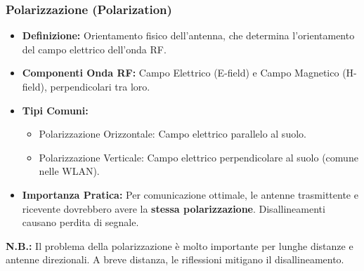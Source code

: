 \subsubsection{Polarizzazione (Polarization)}
\begin{itemize}
    \item \textbf{Definizione:} Orientamento fisico dell'antenna, che determina l'orientamento del campo elettrico dell'onda RF.
    \item \textbf{Componenti Onda RF:} Campo Elettrico (E-field) e Campo Magnetico (H-field), perpendicolari tra loro.
    \item \textbf{Tipi Comuni:}
    \begin{itemize}
        \item Polarizzazione Orizzontale: Campo elettrico parallelo al suolo.
        \item Polarizzazione Verticale: Campo elettrico perpendicolare al suolo (comune nelle WLAN).
    \end{itemize}
    \item \textbf{Importanza Pratica:} Per comunicazione ottimale, le antenne trasmittente e ricevente dovrebbero avere la \textbf{stessa polarizzazione}. Disallineamenti causano perdita di segnale.
\end{itemize}
\begin{center}
\end{center}
\textbf{N.B.:} Il problema della polarizzazione è molto importante per lunghe distanze e antenne direzionali. A breve distanza, le riflessioni mitigano il disallineamento.

